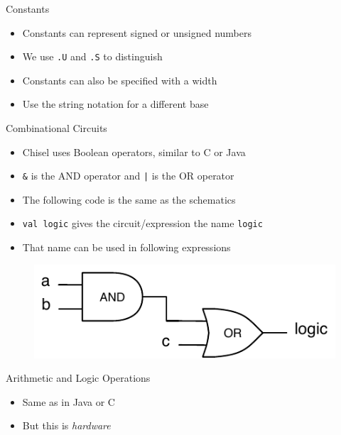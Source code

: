\documentclass[xcolor=pdflatex,dvipsnames,table]{beamer}
\newcommand{\scale}{0.7}
\newcommand{\code}[1]{{\texttt{#1}}}
\begin{document}
\begin{frame}[fragile]{Constants}
\begin{itemize}
\item Constants can represent signed or unsigned numbers
\item We use \code{.U} and \code{.S} to distinguish
\end{itemize}
\begin{itemize}
\item Constants can also be specified with a width
\end{itemize}
\begin{itemize}
\item Use the string notation for a different base
\end{itemize}
\end{frame}

\begin{frame}[fragile]{Combinational Circuits}
\begin{itemize}
\item Chisel uses Boolean operators, similar to C or Java
\item \code{\&} is the AND operator and \code{|} is the OR operator
\item The following code is the same as the schematics
\item \code{val logic} gives the circuit/expression the name \code{logic}
\item That name can be used in following expressions
\end{itemize}
\begin{figure}
  \includegraphics[scale=\scale]{../figures/logic}
\end{figure}
\end{frame}


\begin{frame}[fragile]{Arithmetic and Logic Operations}
\begin{itemize}
\item Same as in Java or C
\item But this is \emph{hardware}
\end{itemize}
\end{frame}
\end{document}
